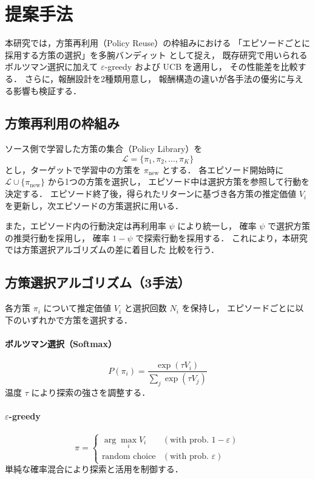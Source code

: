 \section{提案手法}
本研究では，方策再利用（Policy Reuse）の枠組みにおける
「エピソードごとに採用する方策の選択」を多腕バンディット
として捉え，
既存研究で用いられるボルツマン選択に加えて 
$\varepsilon$-greedy および UCB を適用し，
その性能差を比較する．
さらに，報酬設計を2種類用意し，
報酬構造の違いが各手法の優劣に与える影響も検証する．

\subsection{方策再利用の枠組み}
ソース側で学習した方策の集合（Policy Library）を
\begin{equation}
\mathcal{L}=\{\pi_1,\pi_2,\dots,\pi_K\}
\end{equation}
とし，ターゲットで学習中の方策を $\pi_{\mathrm{new}}$ とする．
各エピソード開始時に $\mathcal{L}\cup\{\pi_{\mathrm{new}}\}$ 
から1つの方策を選択し，
エピソード中は選択方策を参照して行動を決定する．
エピソード終了後，得られたリターンに基づき各方策の推定価値
 $V_i$ を更新し，次エピソードの方策選択に用いる．

また，エピソード内の行動決定は再利用率 $\psi$ により統一し，
確率 $\psi$ で選択方策の推奨行動を採用し，
確率 $1-\psi$ で探索行動を採用する．
これにより，本研究では方策選択アルゴリズムの差に着目した
比較を行う．

\subsection{方策選択アルゴリズム（3手法）}
各方策 $\pi_i$ について推定価値 $V_i$ と選択回数 $N_i$ を保持し，
エピソードごとに以下のいずれかで方策を選択する．

\paragraph{ボルツマン選択（Softmax）}
\begin{equation}
P(\pi_i)=\frac{\exp(\tau V_i)}{\sum_{j}\exp(\tau V_j)}
\end{equation}
温度 $\tau$ により探索の強さを調整する．

\paragraph{$\varepsilon$-greedy}
\begin{equation}
\pi=
\begin{cases}
\arg\max_i V_i & (\text{with prob. } 1-\varepsilon)\\
\text{random choice} & (\text{with prob. } \varepsilon)
\end{cases}
\end{equation}
単純な確率混合により探索と活用を制御する．

